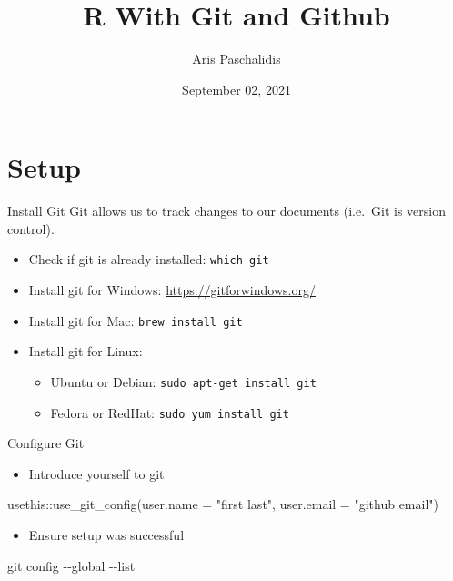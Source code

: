 \documentclass[
  ignorenonframetext,
]{beamer}
\title{R With Git and Github}
\author{Aris Paschalidis}
\date{September 02, 2021}
\newenvironment{Shaded}{\begin{snugshade}}{\end{snugshade}}
\newcommand{\AttributeTok}[1]{\textcolor[rgb]{0.77,0.63,0.00}{#1}}
\newcommand{\FunctionTok}[1]{\textcolor[rgb]{0.00,0.00,0.00}{#1}}
\newcommand{\NormalTok}[1]{#1}
\newcommand{\SpecialCharTok}[1]{\textcolor[rgb]{0.00,0.00,0.00}{#1}}
\newcommand{\StringTok}[1]{\textcolor[rgb]{0.31,0.60,0.02}{#1}}
\providecommand{\tightlist}{%
  \setlength{\itemsep}{0pt}\setlength{\parskip}{0pt}}
\begin{document}
\frame{\titlepage}

\begin{frame}[allowframebreaks]
  \tableofcontents[hideallsubsections]
\end{frame}
\hypertarget{setup}{%
\section{Setup}\label{setup}}

\begin{frame}[fragile]{Install Git}
\protect\hypertarget{install-git}{}
Git allows us to track changes to our documents (i.e.~Git is version
control).

\begin{itemize}
\item
  Check if git is already installed: \texttt{which\ git}
\item
  Install git for Windows: \url{https://gitforwindows.org/}
\item
  Install git for Mac: \texttt{brew\ install\ git}
\item
  Install git for Linux:

  \begin{itemize}
  \tightlist
  \item
    Ubuntu or Debian: \texttt{sudo\ apt-get\ install\ git}
  \item
    Fedora or RedHat: \texttt{sudo\ yum\ install\ git}
  \end{itemize}
\end{itemize}
\end{frame}

\begin{frame}[fragile]{Configure Git}
\protect\hypertarget{configure-git}{}
\begin{itemize}
\tightlist
\item
  Introduce yourself to git
\end{itemize}

\begin{Shaded}
\begin{Highlighting}[]
\NormalTok{usethis}\SpecialCharTok{::}\FunctionTok{use\_git\_config}\NormalTok{(}\AttributeTok{user.name =} \StringTok{"first last"}\NormalTok{,}
                        \AttributeTok{user.email =} \StringTok{"github email"}\NormalTok{)}
\end{Highlighting}
\end{Shaded}

\begin{itemize}
\tightlist
\item
  Ensure setup was successful
\end{itemize}

\begin{Shaded}
\begin{Highlighting}[]
\FunctionTok{git}\NormalTok{ config }\AttributeTok{{-}{-}global} \AttributeTok{{-}{-}list} 
\end{Highlighting}
\end{Shaded}
\end{frame}
\end{document}
